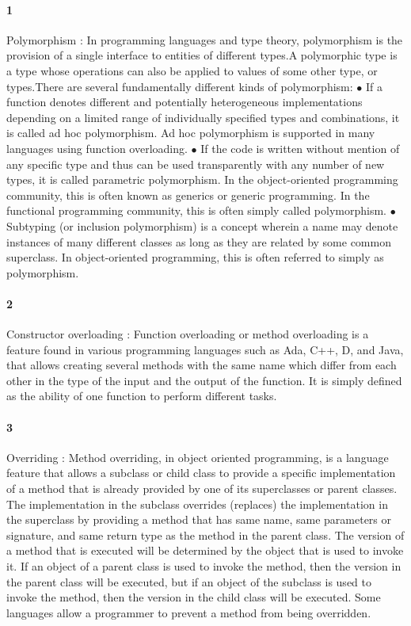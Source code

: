 \documentclass{article}
\begin{document}
\paragraph{1}
Polymorphism : In programming languages and type theory, polymorphism is the provision of a single interface to entities of different types.A polymorphic type is a type whose operations can also be applied to values of some other type, or types.There are several fundamentally different kinds of polymorphism:
\newline
$\bullet$ If a function denotes different and potentially heterogeneous implementations depending on a limited range of individually specified types and combinations, it is called ad hoc polymorphism. Ad hoc polymorphism is supported in many languages using function overloading.
\newline
$\bullet$ If the code is written without mention of any specific type and thus can be used transparently with any number of new types, it is called parametric polymorphism. In the object-oriented programming community, this is often known as generics or generic programming. In the functional programming community, this is often simply called polymorphism.
\newline
$\bullet$ Subtyping (or inclusion polymorphism) is a concept wherein a name may denote instances of many different classes as long as they are related by some common superclass. In object-oriented programming, this is often referred to simply as polymorphism.
\paragraph{2}
Constructor overloading : Function overloading or method overloading is a feature found in various programming languages such as Ada, C++, D, and Java, that allows creating several methods with the same name which differ from each other in the type of the input and the output of the function. It is simply defined as the ability of one function to perform different tasks.
\paragraph{3}
Overriding : Method overriding, in object oriented programming, is a language feature that allows a subclass or child class to provide a specific implementation of a method that is already provided by one of its superclasses or parent classes. The implementation in the subclass overrides (replaces) the implementation in the superclass by providing a method that has same name, same parameters or signature, and same return type as the method in the parent class. The version of a method that is executed will be determined by the object that is used to invoke it. If an object of a parent class is used to invoke the method, then the version in the parent class will be executed, but if an object of the subclass is used to invoke the method, then the version in the child class will be executed. Some languages allow a programmer to prevent a method from being overridden.
\end{document}

